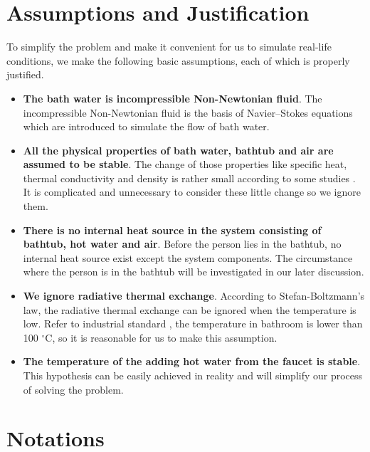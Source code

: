 \section{Assumptions and Justification}

To simplify the problem and make it convenient for us to simulate real-life conditions, we make the following basic assumptions, each of which is properly justified.

\begin{itemize}
    \item {\bf The bath water is incompressible Non-Newtonian fluid}. The incompressible Non-Newtonian fluid is the basis of Navier–Stokes equations which are introduced to simulate the flow of bath water.

    \item {\bf All the physical properties of bath water, bathtub and air are assumed to be stable}. The change of those properties like specific heat, thermal conductivity and density is rather small according to some studies \cite{5}. It is complicated and unnecessary to consider these little change so we ignore them.

    \item {\bf There is no internal heat source in the system consisting of bathtub, hot water and air}. Before the person lies in the bathtub, no internal heat source exist except the system components. The circumstance where the person is in the bathtub will be investigated in our later discussion.

    \item {\bf We ignore radiative thermal exchange}. According to Stefan-Boltzmann’s law, the radiative thermal exchange can be ignored when the temperature is low. Refer to industrial standard \cite{6}, the temperature in bathroom is lower than 100 $^{\circ}$C, so it is reasonable for us to make this assumption.

    \item {\bf The temperature of the adding hot water from the faucet is stable}. This hypothesis can be easily achieved in reality and will simplify our process of solving the problem.
\end{itemize}

\section{Notations}

